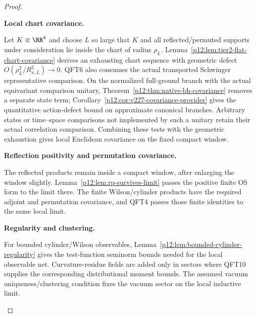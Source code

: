\documentclass[12pt,a4paper]{article}
\begin{document}
\begin{proof}

\begin{proofsteps}

\item \textbf{Local chart covariance.}\par\noindent
Let \(K\Subset\RR^4\) and choose \(L\) so large that \(K\) and all
reflected/permuted supports under consideration lie inside the chart of radius
\(\rho_L\). Lemma~\ref{p12:lem:tier2-flat-chart-covariance} derives an exhausting chart sequence with geometric defect \(O(\rho_L^2/R_{x,L}^2)\to0\).  QFT6 also consumes the actual transported Schwinger representative comparison. On the normalized full-ground branch with the actual equivariant comparison unitary, Theorem~\ref{p12:thm:native-bh-covariance} removes a separate state term; Corollary~\ref{p12:cor:v227-covariance-provider} gives the quantitative action-defect bound on approximate canonical branches. Arbitrary states or time--space comparisons not implemented by such a unitary retain their actual correlation comparison. Combining these tests with the geometric exhaustion gives local Euclidean covariance on the fixed compact window.

\item \textbf{Reflection positivity and permutation covariance.}\par\noindent
The reflected products remain inside a compact window, after enlarging the
window slightly. Lemma~\ref{p12:lem:rp-survives-limit} passes the positive
finite OS form to the limit there. The finite Wilson/\allowbreak cylinder
products have the required adjoint and permutation covariance, and QFT4 passes
those finite identities to the same local limit.

\item \textbf{Regularity and clustering.}\par\noindent
For bounded cylinder/\allowbreak Wilson observables,
Lemma~\ref{p12:lem:bounded-cylinder-regularity} gives the test-function seminorm
bounds needed for the local observable net. Curvature-residue fields are added
only in sectors where QFT10 supplies the corresponding distributional moment
bounds. The assumed vacuum uniqueness/\allowbreak clustering condition fixes
the vacuum sector on the local inductive limit.


\end{proofsteps}
\end{proof}
\end{document}
